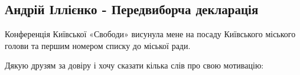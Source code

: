  
 

\subsection{Андрій Іллієнко - Передвиборча декларація}
\label{sec:15_10_2020.fb.reklama.illienko_andrii}

Конференція Київської «Свободи» висунула мене на посаду Київського міського
голови та першим номером списку до міської ради.

Дякую друзям за довіру і хочу сказати кілька слів про свою мотивацію:

